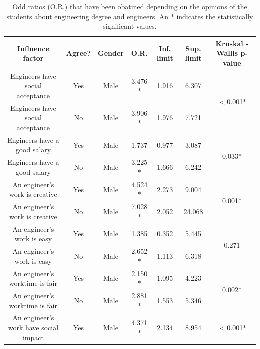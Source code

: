 \documentclass[journal,transmag]{IEEEtran}
\begin{document}
\begin{table}
	\caption[Odd ratios for every influence factor.]{Odd ratios (O.R.) that have been obatined depending on the opinions of the students about engineering degree and engineers. An \textbf{$*$} indicates the statistically significant values.}
	\label{tab:oddratiosop}
	
	\begin{center}
		\begin{tabular}{|c|c|c|c|c|c|c|}
		\hline
		Influence factor                        & Agree? & Gender & O.R.     & Inf. limit & Sup. limit & Kruskal - Wallis p-value     \\ \hline
		Engineers have social acceptance        & Yes    & Male   & 3.476$*$ & 1.916      & 6.307      & \multirow{2}{*}{$<$0.001$*$} \\ \cline{1-6}
		Engineers have social acceptance        & No     & Male   & 3.906$*$ & 1.976      & 7.721      &                              \\ \hline
		Engineers have a good salary            & Yes    & Male   & 1.737    & 0.977      & 3.087      & \multirow{2}{*}{0.033$*$}    \\ \cline{1-6}
		Engineers have a good salary            & No     & Male   & 3.225$*$ & 1.666      & 6.242      &                              \\ \hline
		An engineer’s work is creative          & Yes    & Male   & 4.524$*$ & 2.273      & 9.004      & \multirow{2}{*}{0.001$*$}    \\ \cline{1-6}
		An engineer’s work is creative          & No     & Male   & 7.028$*$ & 2.052      & 24.068     &                              \\ \hline
		An engineer’s work is easy              & Yes    & Male   & 1.385    & 0.352      & 5.445      & \multirow{2}{*}{0.271}       \\ \cline{1-6}
		An engineer’s work is easy              & No     & Male   & 2.652$*$ & 1.113      & 6.318      &                              \\ \hline
		An engineer’s worktime is fair          & Yes    & Male   & 2.150$*$ & 1.095      & 4.223      & \multirow{2}{*}{0.002$*$}    \\ \cline{1-6}
		An engineer’s worktime is fair          & No     & Male   & 2.881$*$ & 1.553      & 5.346      &                              \\ \hline
		An engineer’s work have social impact   & Yes    & Male   & 4.371$*$ & 2.134      & 8.954      & \multirow{2}{*}{$<$0.001$*$} \\ \cline{1-6}

\end{tabular}
\end{center}
\end{table}
\end{document}
